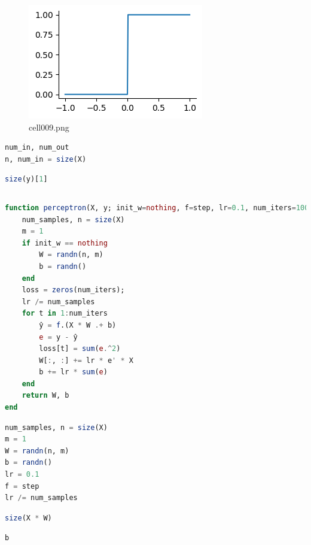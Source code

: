 \begin{figure}[ht]
	\centering
	\includegraphics[scale=0.8, max width=\linewidth]{./fig/local-learning-rule/logistic-regression-perceptron/cell009.png}
	\caption{cell009.png}
	\label{cell009.png}
\end{figure}
\begin{lstlisting}[language=julia]
num_in, num_out
n, num_in = size(X)
\end{lstlisting}
\begin{lstlisting}[language=julia]
size(y)[1]
\end{lstlisting}
\begin{lstlisting}[language=julia]

\end{lstlisting}
\begin{lstlisting}[language=julia]
function perceptron(X, y; init_w=nothing, f=step, lr=0.1, num_iters=100)
    num_samples, n = size(X)
    m = 1
    if init_w == nothing
        W = randn(n, m)
        b = randn()
    end
    loss = zeros(num_iters);
    lr /= num_samples
    for t in 1:num_iters
        ŷ = f.(X * W .+ b)
        e = y - ŷ
        loss[t] = sum(e.^2) 
        W[:, :] += lr * e' * X
        b += lr * sum(e)
    end
    return W, b
end
\end{lstlisting}
\begin{lstlisting}[language=julia]
num_samples, n = size(X)
m = 1
W = randn(n, m)
b = randn()
lr = 0.1
f = step
lr /= num_samples
\end{lstlisting}
\begin{lstlisting}[language=julia]
size(X * W)
\end{lstlisting}
\begin{lstlisting}[language=julia]
b
\end{lstlisting}
